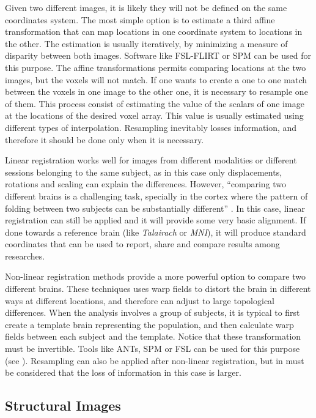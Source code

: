 Given two different images, it is likely they will not be defined on the same coordinates system. The most simple option is to estimate a third affine transformation that can map locations in one coordinate system to locations in the other. The estimation is usually iteratively, by minimizing a measure of disparity between both images. Software like FSL-FLIRT \autocite{jenkinson_fsl_2012} or SPM \autocite{friston_statistical_2007} can be used for this purpose. The affine transformations permits comparing locations at the two images, but the voxels will not match. If one wants to create a one to one match between the voxels in one image to the other one, it is necessary to resample one of them. This process consist of estimating the value of the scalars of one image at the locations of the desired voxel array. This value is usually estimated using different types of interpolation. Resampling inevitably losses information, and therefore it should be done only when it is necessary.

Linear registration works well for images from different modalities or different sessions belonging to the same subject, as in this case only displacements, rotations and scaling can explain the differences. However, ``comparing two different brains is a challenging task, specially in the cortex where the pattern of folding between two subjects can be substantially different'' \autocite{toga_new_2002}. In this case, linear registration can still be applied and it will provide some very basic alignment. If done towards a reference brain (like \emph{Talairach} or \emph{MNI}), it will produce standard coordinates that can be used to report, share and compare results among researches.

Non-linear registration methods provide a more powerful option to compare two different brains. These techniques uses warp fields to distort the brain in different ways at different locations, and therefore can adjust to large topological differences. When the analysis involves a group of subjects, it is typical to first create a template brain representing the population, and then calculate warp fields between each subject and the template. Notice that these transformation must be invertible. Tools like ANTs, SPM or FSL can be used for this purpose (see \autocite{klein_evaluation_2009,klein_evaluation_2010}). Resampling can also be applied after non-linear registration, but in must be considered that the loss of information in this case is larger.
 
\subsection{Structural Images}

